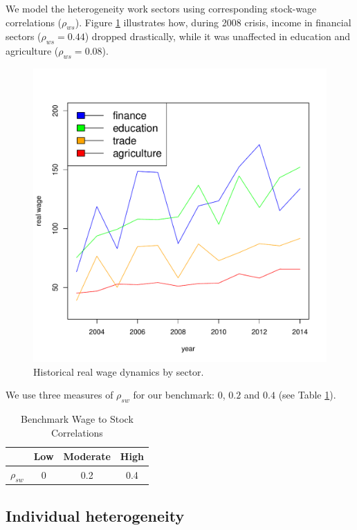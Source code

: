 We model the heterogeneity work sectors using corresponding stock-wage correlations ($\rho_{ws}$). Figure \ref{fig:wagesec} illustrates how, during 2008 crisis, income in financial sectors ($\rho_{ws} = 0.44$) dropped drastically, while it was unaffected in education and agriculture ($\rho_{ws} = 0.08$).
\begin{figure}[h!]
	\centering
	\includegraphics[scale=0.4]{figs/wage2sec.pdf}
	\caption{Historical real wage dynamics by sector.}
	\label{fig:wagesec}
\end{figure}

We use three measures of $\rho_{sw}$ for our benchmark: $0$, $0.2$ and $0.4$ (see Table \ref{table:wagesec}).


\begin{table}[h!]
	\centering
	\caption{Benchmark Wage to Stock Correlations}
	\label{table:wagesec}
	\begin{tabular}[c]{c|ccc}
		&Low&Moderate&High\\
		\hline
		$\rho_{sw}$&0&0.2&0.4
	\end{tabular}
\end{table}


\subsection{Individual heterogeneity}

